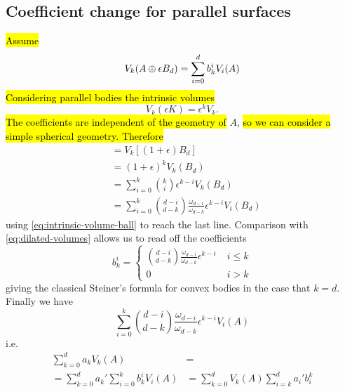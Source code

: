 \subsection{Coefficient change for parallel surfaces}
\hl{Assume}
\begin{equation}\label{eq:dilated-volumes}
  V_k(A \oplus \epsilon B_d)
  =
  \sum_{i=0}^d b_k^i V_i(A)
\end{equation}
\hl{Considering parallel bodies the intrinsic volumes}
\begin{equation*}
  V_k (\epsilon K)
  =
  \epsilon^k V_k.
\end{equation*}
\hl{The coefficients are independent of the geometry of} $A$, \hl{so we can consider a simple spherical geometry.
Therefore}
\begin{equation*}
  \begin{split}
  &=
  V_k \left[ (1+\epsilon) B_d \right]
  \\ &=
  (1+\epsilon)^k V_k(B_d)
  \\ &=
  \sum_{i=0}^k {k \choose i} \epsilon^{k-i} V_k(B_d)
  \\ &=
  \sum_{i=0}^k {d-i \choose d-k}
  \frac{\omega_{d-i}}{\omega_{d-k}}
  \epsilon^{k-i} V_i(B_d)
  \end{split}
\end{equation*}
using \eqref{eq:intrinsic-volume-ball} to reach the last line.
Comparison with \eqref{eq:dilated-volumes} allows us to read off the coefficients
\begin{equation}\label{eq:dilated-volume-coefficients}
  b_k^i =
  \begin{cases}
    { d-i \choose d-k }
    \frac{\omega_{d-i}}{\omega_{d-k}}
    \epsilon^{k-i}
    & \; i \le k \\
    0 & \; i > k
  \end{cases}
\end{equation}
giving the classical Steiner's formula for convex bodies in the case that $k=d$.
Finally we have
\begin{equation}
  \sum_{i=0}^k { d-i \choose d-k }
  \frac{\omega_{d-i}}{\omega_{d-k}}
  \epsilon^{k-i} V_i(A)
\end{equation}
i.e.
\begin{equation}
  \begin{split}
    \sum_{k=0}^d a_k V_k(A)
    &=
    \\ =
    \sum_{k=0}^d a_k' \sum_{i=0}^k b_k^i V_i(A)
    &=
    \sum_{k=0}^d V_k(A) \sum_{i=k}^d a_i' b_i^k
  \end{split}
\end{equation}
